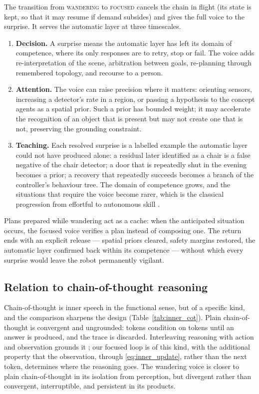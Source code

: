 The transition from \textsc{wandering} to \textsc{focused} cancels the chain in flight (its state is kept, so that
it may resume if demand subsides) and gives the full voice to the surprise. It serves the automatic layer at three
timescales.
\begin{enumerate}
    \item \textbf{Decision.} A surprise means the automatic layer has left its domain of competence, where its only
    responses are to retry, stop or fail. The voice adds re-interpretation of the scene, arbitration between goals,
    re-planning through remembered topology, and recourse to a person.
    \item \textbf{Attention.} The voice can raise precision where it matters: orienting sensors, increasing a
    detector's rate in a region, or passing a hypothesis to the concept agents as a spatial prior. Such a prior has
    bounded weight; it may accelerate the recognition of an object that is present but may not create one that is
    not, preserving the grounding constraint.
    \item \textbf{Teaching.} Each resolved surprise is a labelled example the automatic layer could not have
    produced alone: a residual later identified as a chair is a false negative of the chair detector; a door that
    is repeatedly shut in the evening becomes a prior; a recovery that repeatedly succeeds becomes a branch of the
    controller's behaviour tree. The domain of competence grows, and the situations that require the voice become
    rarer, which is the classical progression from effortful to autonomous skill \cite{fitts1967human}.
\end{enumerate}
Plans prepared while wandering act as a cache: when the anticipated situation occurs, the focused voice verifies a
plan instead of composing one. The return ends with an explicit release --- spatial priors cleared, safety margins
restored, the automatic layer confirmed back within its competence --- without which every surprise would leave
the robot permanently vigilant.

\subsection{Relation to chain-of-thought reasoning}
\label{sec:inner_speech:cot}

Chain-of-thought is inner speech in the functional sense, but of a specific kind, and the comparison sharpens the
design (Table~\ref{tab:inner_cot}). Plain chain-of-thought is convergent and ungrounded: tokens condition on
tokens until an answer is produced, and the trace is discarded. Interleaving reasoning with action and observation
grounds it \cite{yao2023react}; our focused loop is of this kind, with the additional property that the
observation, through \eqref{eq:inner_update}, rather than the next token, determines where the reasoning goes.
The wandering voice is closer to plain chain-of-thought in its isolation from perception, but divergent rather
than convergent, interruptible, and persistent in its products.

